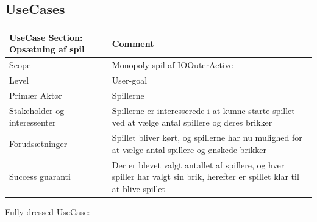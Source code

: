 \subsection{UseCases}
\begin{center}
\begin{tabular}{ | m{10em} | m{10cm}| }
        \hline
            UseCase Section: Opsætning af spil & Comment\\
        \hline
            Scope & Monopoly spil af IOOuterActive\\
        \hline
            Level & User-goal\\
        \hline
            Primær Aktør & Spillerne\\
        \hline
            Stakeholder og interessenter & Spillerne er interesserede i at kunne starte spillet ved at vælge antal spillere og deres brikker\\
        \hline
            Forudsætninger & Spillet bliver kørt, og spillerne har nu mulighed for at vælge antal spillere og ønskede brikker\\
        \hline
            Success guaranti & Der er blevet valgt antallet af spillere, og hver spiller har valgt sin brik, herefter er spillet klar til at blive spillet\\
        \hline
    \end{tabular}
\end{center}
\pagebreak
Fully dressed UseCase:
